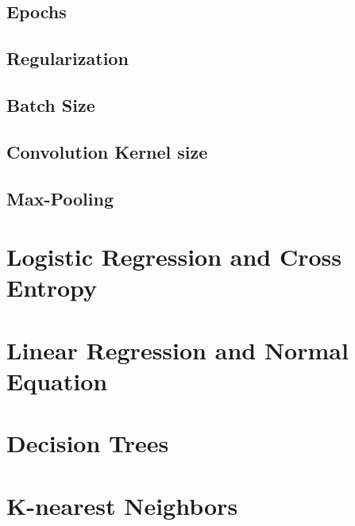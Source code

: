 \subsection{Epochs}
\subsection{Regularization}
\subsection{Batch Size}
\subsection{Convolution Kernel size}
\subsection{Max-Pooling}

\section{Logistic Regression and Cross Entropy}


\section{Linear Regression and Normal Equation}


\section{Decision Trees}


\section{K-nearest Neighbors}

